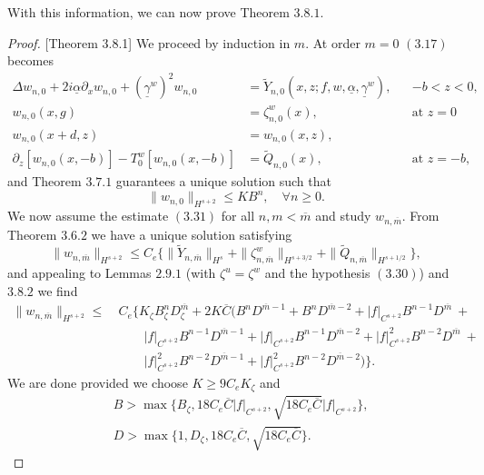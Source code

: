 \begin{flushleft}
With this information, we can now prove Theorem $3.8.1.$
\end{flushleft}
\vskip 0.1in
\begin{proof}{[Theorem 3.8.1]} We proceed by induction in $m$. At order $m=0$ $(3.17)$ becomes
\begin{subequations}
\begin{align}
\Delta w_{n,0} +2i\underline{\alpha}\partial_{x}w_{n,0}+(\underline{\gamma}^w)^2w_{n,0}&=\tilde{Y}_{n,0}\left(x,z;f,w,\underline{\alpha},\underline{\gamma}^w\right),&&\text{$-b<z<0$}, \\
w_{n,0}(x,g)&=\zeta^w_{n,0}(x),&&\text{at $z=0$}\\
w_{n,0}(x+d,z)&=w_{n,0}(x,z), \\
\partial_z \left[w_{n,0}(x,-b)\right] - T_0^w[w_{n,0}(x,-b)]&=\tilde{Q}_{n,0}(x),&& \text{at $z=-b$},
\end{align}
\end{subequations}
and Theorem $3.7.1$ guarantees a unique solution such that 
$$\|w_{n,0}\|_{H^{s+2}}\le KB^n,\quad \text{$\forall n\ge 0$}.  $$
We now assume the estimate $(3.31)$ for all $n, m < \overline{m}$ and study $w_{n,\overline{m}}$. From Theorem $3.6.2$ we have a unique solution satisfying 
$$\|w_{n,\overline{m}}\|_{H^{s+2}}\le C_e\{\|\tilde{Y}_{n,\overline{m}}\|_{H^{s}}+\|\zeta^w_{n,\overline{m}}\|_{H^{s+3/2}}+\|\tilde{Q}_{n,\overline{m}}\|_{H^{s+1/2}}  \}, $$
and appealing to Lemmas $2.9.1$ (with $\zeta^u=\zeta^w$ and the hypothesis $(3.30)$) and $3.8.2$ we find
\begin{align*}\|w_{n,\overline{m}}\|_{H^{s+2}}\le & ~C_e\Bigg\{K_{\zeta}B_{\zeta}^{n}D_{\zeta}^{\overline{m}} + 2K\overline{C}\bigg(B^nD^{\overline{m}-1}+B^nD^{\overline{m}-2} + |f|_{C^{s+2}}B^{n-1}D^{\overline{m}} ~+\nonumber\\&~\qquad
|f|_{C^{s+2}}B^{n-1}D^{\overline{m}-1} +  |f|_{C^{s+2}}B^{n-1}D^{\overline{m}-2} +
  |f|_{C^{s+2}}^2B^{n-2}D^{\overline{m}} ~+ \nonumber\\&~\qquad
|f|_{C^{s+2}}^2B^{n-2}D^{\overline{m}-1} +
|f|_{C^{s+2}}^2B^{n-2}D^{\overline{m}-2}
\bigg)\Bigg\}.
\end{align*}
We are done provided we choose $K \ge 9C_eK_{\zeta}$ and
\begin{align*}&B  > \max\Big\{B_{\zeta},18C_e\overline{C}|f|_{C^{s+2}},\sqrt{18C_e\overline{C}}|f|_{C^{s+2}}\Big\},\\&
D  > \max\Big\{1,D_{\zeta},18C_e\overline{C},\sqrt{18C_e\overline{C}} \Big\}.
\end{align*}
\end{proof}